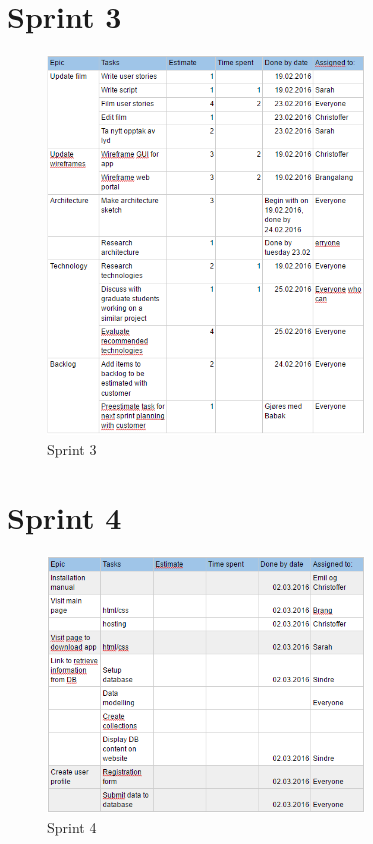 \section{Sprint 3}\label{sprint3}

\begin{figure}[H]
\centering
\includegraphics[width = 0.75\textwidth]{Figures/sprints/sprint3}
\caption{Sprint 3}
    \label{fig:SP3}
    \end{figure}

\section{Sprint 4}\label{sprint4}

\begin{figure}[H]
\centering
\includegraphics[width = 0.75\textwidth]{Figures/sprints/sprint4}
\caption{Sprint 4}
    \label{fig:SP4}
    \end{figure}


